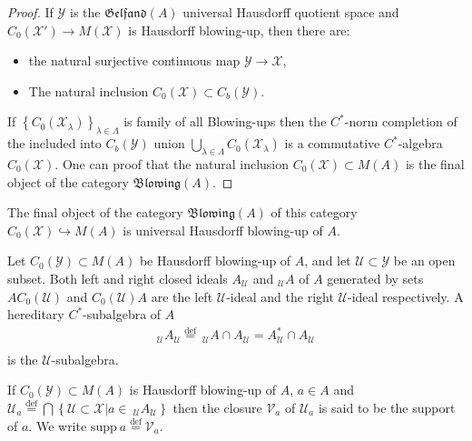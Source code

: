 \documentclass{beamer}
\theoremstyle{plain}
\newcommand{\be}{\begin{equation}}
\newcommand{\ee}{\end{equation}}
\newcommand{\supp}{\mathrm{supp}}
\newcommand{\sU}{\mathcal{U}}       %
\newcommand{\sV}{\mathcal{V}}       %
\newcommand{\sX}{\mathcal{X}}       %
\newcommand{\sY}{\mathcal{Y}}       %
\newcommand{\la}{\lambda}
\newcommand{\La}{\Lambda}
\newcommand{\bydef}{\stackrel{\mathrm{def}}{=}}
\newcommand{\hookto}{\hookrightarrow}        %
\begin{document}
\begin{frame}
\begin{proof}
	If $\sY$ is the $\mathfrak{Gelfand}\left( A\right)
	$ {universal Hausdorff quotient space} and $C_0\left( \sX'\right) \to M\left(\sX  \right)$ is Hausdorff blowing-up, then   there are:
	\begin{itemize}
		\item the natural surjective continuous map $\sY \to \sX$,
		\item The natural  inclusion $C_0\left(\sX \right)\subset C_b\left(\sY \right)$. 
	\end{itemize}
	If $\left\{C_0\left(\sX_\la \right) \right\}_{\la \in \La}$  is family of all Blowing-ups then the $C^*$-norm completion of the included into  $C_b\left(\sY \right)$ union $\bigcup_{\la\in \La} C_0\left(\sX_\la \right)$ is a commutative $C^*$-algebra $C_0\left( \sX\right)$. One can proof that the natural inclusion  $C_0\left(\sX \right) \subset M\left( A\right)$ is the final object of the category  $\mathfrak{Blowing}\left(A\right)$.
\end{proof}
\begin{definition}\label{blowing_universal_defn}
	The final object of the category $\mathfrak{Blowing}\left(A\right)$  of this category $C_0\left( \sX\right) \hookto M\left(A \right)$ is  \alert{universal Hausdorff blowing-up of} $A$.
\end{definition}	
\end{frame}
\begin{frame}
\begin{definition}\label{blowing_ideals_au_ua_defn}
	Let  $ C_0\left( \sY\right)\subset  M\left( A\right) $ be  Hausdorff blowing-up of $A$, and let $\sU \subset \sY$ be an open subset. Both   left and right  closed ideals $A_\sU$  and $_\sU A$ of $A$ generated by sets 	$AC_0\left( \sU\right)$ and $C_0\left( \sU\right)A$ are the \alert{left} $\sU$-\alert{ideal} and the \alert{right} $\sU$-\alert{ideal} respectively. A hereditary $C^*$-subalgebra of $A$
	\be\label{blowing_hereditary_u_eqn} 
	\begin{split}
		_\sU A_\sU \bydef	~	_\sU A\cap  A_\sU = A^*	_\sU \cap  A_\sU\\ %
	\end{split}
	\ee	
	is the $ \sU$-\alert{subalgebra}.
	
\end{definition}
	\begin{definition}\label{blowing_support_defn}
	If $C_0\left( \sY\right) \subset M\left(A \right)$ is    {Hausdorff blowing-up} of $A$,  $a \in A$ and
	$
	\sU_a \bydef\bigcap 
	\left\{\left.{\sU} \subset \sX\right| a\in~_\sU A_{\sU} \right\}
	$
	then the  closure $\sV_a$  of $\sU_a$ is said to be the \alert{support} of $a$. We write $\supp~ a \bydef \sV_a$.
\end{definition}
\end{frame}
\end{document}
